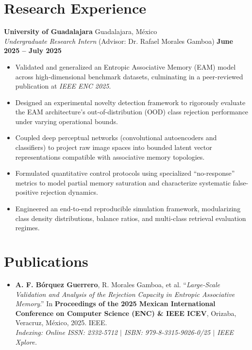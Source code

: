 \documentclass[11pt]{article}
\begin{document}
\section*{Research Experience}
\textbf{University of Guadalajara} \hfill Guadalajara, México \\
\textit{Undergraduate Research Intern} (Advisor: Dr. Rafael Morales Gamboa) \hfill \textbf{June 2025 -- July 2025}
\vspace{-0.3cm}
\begin{itemize}
    \item Validated and generalized an Entropic Associative Memory (EAM) model across high-dimensional benchmark datasets, culminating in a peer-reviewed publication at \textit{IEEE ENC 2025}.

    \vspace{-0.3cm}
    \item Designed an experimental novelty detection framework to rigorously evaluate the EAM architecture's out-of-distribution (OOD) class rejection performance under varying operational bounds.

    \vspace{-0.3cm}
    \item Coupled deep perceptual networks (convolutional autoencoders and classifiers) to project raw image spaces into bounded latent vector representations compatible with associative memory topologies.

    \vspace{-0.3cm}
    \item Formulated quantitative control protocols using specialized ``no-response'' metrics to model partial memory saturation and characterize systematic false-positive rejection dynamics.

    \vspace{-0.3cm}
    \item Engineered an end-to-end reproducible simulation framework, modularizing class density distributions, balance ratios, and multi-class retrieval evaluation regimes.
\end{itemize}



\section*{Publications}
\begin{itemize}
    \item \textbf{A. F. Bórquez Guerrero}, R. Morales Gamboa, et al. ``\textit{Large-Scale Validation and Analysis of the Rejection Capacity in Entropic Associative Memory}.'' In \textbf{Proceedings of the 2025 Mexican International Conference on Computer Science (ENC) \& IEEE ICEV}, Orizaba, Veracruz, México, 2025. IEEE. \\
    \footnotesize\textit{Indexing: Online ISSN: 2332-5712 $\vert$ ISBN: 979-8-3315-9026-0/25 $\vert$ IEEE Xplore.}
\end{itemize}
\end{document}
